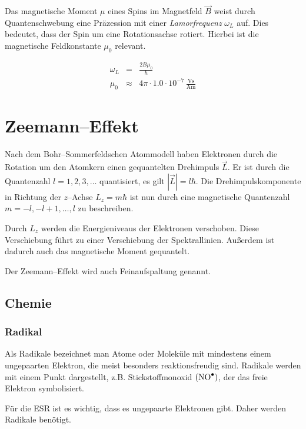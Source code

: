 \documentclass[12pt,a4paper]{scrartcl}
\numberwithin{equation}{section} %
\begin{document}
Das magnetische Moment $\mu$ eines Spins im Magnetfeld $\vec{B}$
weist durch Quantenschwebung eine Präzession mit einer
\emph{Lamorfrequenz} $\omega_L$ auf. Dies bedeutet, dass der Spin um
eine Rotationsachse rotiert. Hierbei ist die magnetische Feldkonstante
$\mu_0$ relevant.

\begin{eqnarray}
    \omega_L &=& \frac{2B\mu_0}{\hbar} \\
    \mu_0 &\approx& 4\pi \cdot 1.0 \cdot 10^{-7} \mathrm{\,\frac{Vs}{Am}}
\end{eqnarray}

\hypertarget{zeemanneffekt}{%
\section{Zeemann--Effekt}\label{zeemanneffekt}}

Nach dem Bohr--Sommerfeldschen Atommodell haben Elektronen durch die
Rotation um den Atomkern einen gequantelten Drehimpuls $\vec{L}$. Er
ist durch die Quantenzahl $l=1,2,3,\dots$ quantisiert, es gilt
$|\vec{L}| = l\hbar$. Die Drehimpulskomponente in Richtung der
$z$--Achse $L_z=m\hbar$ ist nun durch eine magnetische Quantenzahl
$m=-l,-l+1,\dots,l$ zu beschreiben.

Durch $L_z$ werden die Energieniveaus der Elektronen verschoben. Diese
Verschiebung führt zu einer Verschiebung der Spektrallinien. Außerdem
ist dadurch auch das magnetische Moment gequantelt.

Der Zeemann--Effekt wird auch Feinaufspaltung genannt.

\hypertarget{chemie}{%
\subsection{Chemie}\label{chemie}}

\hypertarget{radikal}{%
\subsubsection{Radikal}\label{radikal}}

Als Radikale bezeichnet man Atome oder Moleküle mit mindestens einem
ungepaarten Elektron, die meist besonders reaktionsfreudig sind.
Radikale werden mit einem Punkt dargestellt, z.B. Stickstoffmonoxid
$(\ce{NO^\bullet})$, der das freie Elektron symbolisiert.
\cite{Radikale}

Für die ESR ist es wichtig, dass es ungepaarte Elektronen gibt. Daher
werden Radikale benötigt.
\end{document}
